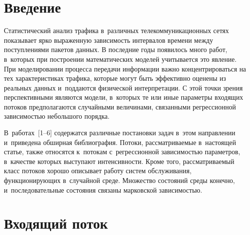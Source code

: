 
\vspace*{6pt}




\thispagestyle{headings}

\begin{multicols}{2}

\label{st\stat}


\section{Введение} 

Статистический анализ трафика в~различных телекоммуникационных сетях 
показывает ярко выраженную зависимость интервалов времени между поступлениями 
пакетов данных. В последние годы появилось много работ, в~которых при 
построении математических моделей учитывается это явление. При моделировании 
процесса передачи информации важно концентрироваться на тех
характеристиках трафика, которые могут быть эффективно оценены из реальных 
данных и~поддаются физической интерпретации. С этой точки
зрения перспективными являются модели, в~которых те или иные параметры входящих 
потоков предполагаются случайными величинами, связанными регрессионной 
зависимостью небольшого порядка. 

В~работах~[1--6] содержатся различные постановки 
задач в~этом направлении и~приведена обширная библиография. Потоки, рассматриваемые 
в~настоящей статье, также относятся к~потокам с~регрессионной зависимостью 
параметров, в~качестве которых выступают интенсивности. Кроме того, рассматриваемый 
класс потоков хорошо описывает работу сис\-тем обслуживания, функционирующих в~случайной 
среде. Множество состояний среды конечно, и~последовательные состояния связаны 
марковской зависимостью.



\section{Входящий поток}


\end{multicols}
